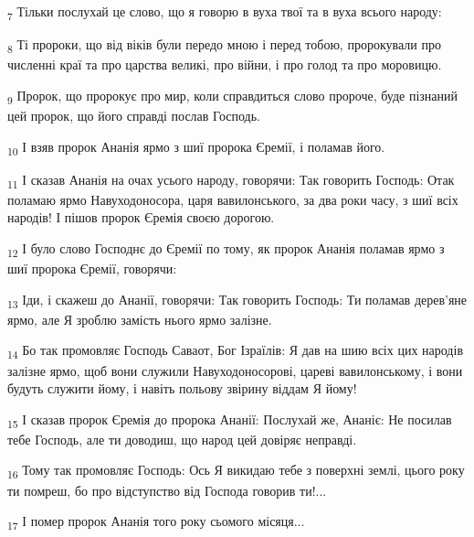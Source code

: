 \begin{tcolorbox}
\textsubscript{7} Тільки послухай це слово, що я говорю в вуха твої та в вуха всього народу:
\end{tcolorbox}
\begin{tcolorbox}
\textsubscript{8} Ті пророки, що від віків були передо мною і перед тобою, пророкували про численні краї та про царства великі, про війни, і про голод та про моровицю.
\end{tcolorbox}
\begin{tcolorbox}
\textsubscript{9} Пророк, що пророкує про мир, коли справдиться слово пророче, буде пізнаний цей пророк, що його справді послав Господь.
\end{tcolorbox}
\begin{tcolorbox}
\textsubscript{10} І взяв пророк Ананія ярмо з шиї пророка Єремії, і поламав його.
\end{tcolorbox}
\begin{tcolorbox}
\textsubscript{11} І сказав Ананія на очах усього народу, говорячи: Так говорить Господь: Отак поламаю ярмо Навуходоносора, царя вавилонського, за два роки часу, з шиї всіх народів! І пішов пророк Єремія своєю дорогою.
\end{tcolorbox}
\begin{tcolorbox}
\textsubscript{12} І було слово Господнє до Єремії по тому, як пророк Ананія поламав ярмо з шиї пророка Єремії, говорячи:
\end{tcolorbox}
\begin{tcolorbox}
\textsubscript{13} Іди, і скажеш до Ананії, говорячи: Так говорить Господь: Ти поламав дерев'яне ярмо, але Я зроблю замість нього ярмо залізне.
\end{tcolorbox}
\begin{tcolorbox}
\textsubscript{14} Бо так промовляє Господь Саваот, Бог Ізраїлів: Я дав на шию всіх цих народів залізне ярмо, щоб вони служили Навуходоносорові, цареві вавилонському, і вони будуть служити йому, і навіть польову звірину віддам Я йому!
\end{tcolorbox}
\begin{tcolorbox}
\textsubscript{15} І сказав пророк Єремія до пророка Ананії: Послухай же, Ананіє: Не посилав тебе Господь, але ти доводиш, що народ цей довіряє неправді.
\end{tcolorbox}
\begin{tcolorbox}
\textsubscript{16} Тому так промовляє Господь: Ось Я викидаю тебе з поверхні землі, цього року ти помреш, бо про відступство від Господа говорив ти!...
\end{tcolorbox}
\begin{tcolorbox}
\textsubscript{17} І помер пророк Ананія того року сьомого місяця...
\end{tcolorbox}
